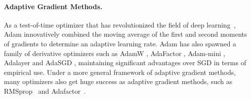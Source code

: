 
\paragraph{Adaptive Gradient Methods.}
As a test-of-time optimizer that has revolutionized the field of deep learning~\citep{kingma2014adam}, Adam innovatively combined the moving average of the first and second moments of gradients to determine an adaptive learning rate. Adam has also spawned a family of derivative optimizers such as AdamW \citep{loshchilov2017decoupled}, AdaFactor \citep{shazeer2018adafactor}, Adam-mini \citep{zhang2025adamminiusefewerlearning}, Adalayer \citep{zhao2025deconstructingmakesgoodoptimizer} and AdaSGD \citep{wang2020adasgd}, maintaining significant advantages over SGD in terms of empirical use. Under a more general framework of adaptive gradient methods, many optimizers also get huge success as adaptive gradient methods, such as RMSprop~\citep{hinton2012neural} and Adafactor~\citep{shazeer2018adafactor}.


